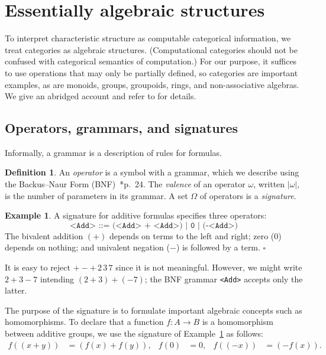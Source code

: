 \documentclass{amsart}
\numberwithin{lstfloat}{section}
\newcommand{\exqed}{\hfill $\square$}
\theoremstyle{definition}
\newtheorem{defn}[thm]{Definition}
\newtheorem{ex}[thm]{Example}
\theoremstyle{remark}
\numberwithin{equation}{section}
\begin{document}
\section{Essentially algebraic structures}\label{sec:Eastern}
 
To interpret characteristic structure as computable categorical information, we
treat categories as algebraic structures.  (Computational
categories should not be confused with categorical semantics of computation.) 
For our purpose, it suffices 
to use operations that may only be partially defined, so categories are important examples, as are
monoids, groups, groupoids, rings, and non-associative algebras. We
give an abridged account and refer to  
for details.

\subsection{Operators, grammars, and signatures}
\label{sec:ops-grammar}
Informally, a grammar is a description of rules for formulas. 

\begin{defn}
  An \emph{operator} is a symbol with a grammar, which we describe 
  using the Backus--Naur Form (BNF)~\cite{Pierce:types}*{p.~24}.  
  The \textit{valence} of an operator $\omega$,
  written $|\omega|$, is the number of parameters in its grammar.
  A set $\Omega$ of operators is a \emph{signature}.
\end{defn}


\begin{ex}\label{ex:additive-grammar}
  A signature for additive formulas specifies three operators:
  \begin{equation*}
    \label{eq:abelian-grammar}
    \texttt{<Add> ::= (<Add> + <Add>)~|~0~|~(-<Add>)}
  \end{equation*}
  The bivalent addition $(+)$ depends on terms to the left and right;
  zero ($0$) depends on nothing; and univalent negation ($-$) is followed by a term. \exqed
\end{ex}
It is easy to reject $+-+\,2\,3\,7$ since it is not  meaningful. However, we might write
$2+3-7$ intending $(2+3)+(-7)$; the BNF grammar  
\texttt{<Add>} accepts only the latter.

The purpose of the signature is to formulate 
important algebraic concepts such as  
homomorphisms.  
To declare that a 
function $f:A\to B$ is a homomorphism between additive groups, 
we use the signature of Example~\ref{ex:additive-grammar} as follows:
\begin{align*} 
  f((x+y)) & = (f(x)+f(y)), & f(0) & =0, & f((-x)) & = (- f(x)).
\end{align*}
\end{document}
